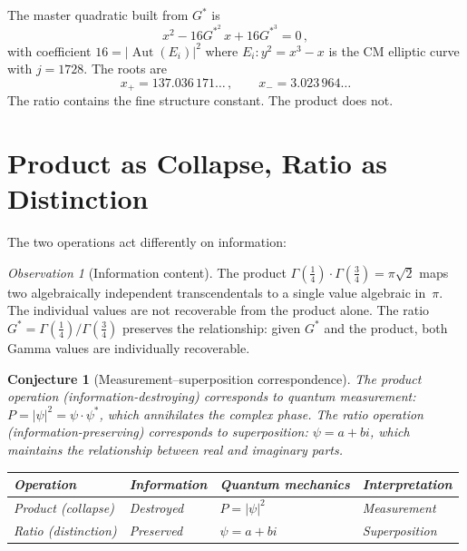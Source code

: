 \documentclass[12pt,reqno]{amsart}
\newtheorem{conjecture}[theorem]{Conjecture}
\theoremstyle{definition}
\theoremstyle{remark}
\newtheorem{observation}[theorem]{Observation}
\newcommand{\Gstar}{G^{\!*}}
\newcommand{\abs}[1]{\lvert #1 \rvert}
\newcommand{\Aut}{\operatorname{Aut}}
\begin{document}
The master quadratic built from $\Gstar$ is
\begin{equation}\label{eq:quadratic}
  x^2 - 16\Gstar^2\,x + 16\Gstar^3 = 0\,,
\end{equation}
with coefficient $16=\abs{\Aut(E_i)}^2$ where $E_i\colon y^2=x^3-x$ is the CM elliptic
curve with $j=1728$. The roots are
\begin{equation}
  x_+ = 137.036\,171\ldots\,,\qquad x_- = 3.023\,964\ldots
\end{equation}
The ratio contains the fine structure constant. The product does not.

\section{Product as Collapse, Ratio as Distinction}

The two operations act differently on information:

\begin{observation}[Information content]
The product $\Gamma(\tfrac14)\cdot\Gamma(\tfrac34)=\pi\sqrt{2}$ maps two
algebraically independent transcendentals to a single value algebraic in~$\pi$.
The individual values are not recoverable from the product alone.
The ratio $\Gstar=\Gamma(\tfrac14)/\Gamma(\tfrac34)$ preserves the relationship:
given $\Gstar$ and the product, both Gamma values are individually recoverable.
\end{observation}

\begin{conjecture}[Measurement--superposition correspondence]
The product operation (information-destroying) corresponds to quantum measurement:
$P=\abs{\psi}^2=\psi\cdot\psi^*$, which annihilates the complex phase.
The ratio operation (information-preserving) corresponds to superposition:
$\psi=a+bi$, which maintains the relationship between real and imaginary parts.

\smallskip
\begin{center}
\begin{tabular}{@{}llll@{}}
\toprule
Operation & Information & Quantum mechanics & Interpretation \\
\midrule
Product (collapse) & Destroyed & $P=\abs{\psi}^2$ & Measurement \\
Ratio (distinction) & Preserved & $\psi=a+bi$ & Superposition \\
\bottomrule
\end{tabular}
\end{center}
\end{conjecture}
\end{document}
